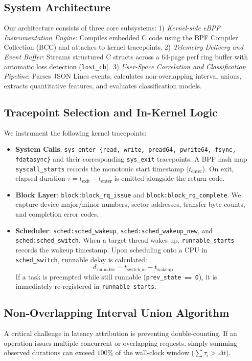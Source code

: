 \documentclass[conference]{IEEEtran}
\begin{document}
\subsection{System Architecture}
Our architecture consists of three core subsystems:
1) \textit{Kernel-side eBPF Instrumentation Engine}: Compiles embedded C code using the BPF Compiler Collection (BCC) and attaches to kernel tracepoints.
2) \textit{Telemetry Delivery and Event Buffer}: Streams structured C structs across a 64-page perf ring buffer with automatic loss detection (\texttt{lost\_cb}).
3) \textit{User-Space Correlation and Classification Pipeline}: Parses JSON Lines events, calculates non-overlapping interval unions, extracts quantitative features, and evaluates classification models.

\subsection{Tracepoint Selection and In-Kernel Logic}
We instrument the following kernel tracepoints:
\begin{itemize}
    \item \textbf{System Calls}: \texttt{sys\_enter\_\{read, write, pread64, pwrite64, fsync, fdatasync\}} and their corresponding \texttt{sys\_exit} tracepoints. A BPF hash map \texttt{syscall\_starts} records the monotonic start timestamp ($t_{\text{enter}}$). On exit, elapsed duration $\tau = t_{\text{exit}} - t_{\text{enter}}$ is emitted alongside the return code.
    \item \textbf{Block Layer}: \texttt{block:block\_rq\_issue} and \texttt{block:block\_rq\_complete}. We capture device major/minor numbers, sector addresses, transfer byte counts, and completion error codes.
    \item \textbf{Scheduler}: \texttt{sched:sched\_wakeup}, \texttt{sched:sched\_wakeup\_new}, and \texttt{sched:sched\_switch}. When a target thread wakes up, \texttt{runnable\_starts} records the wakeup timestamp. Upon scheduling onto a CPU in \texttt{sched\_switch}, runnable delay is calculated:
    \begin{equation}
        d_{\text{runnable}} = t_{\text{switch\_in}} - t_{\text{wakeup}}
    \end{equation}
    If a task is preempted while still runnable (\texttt{prev\_state == 0}), it is immediately re-registered in \texttt{runnable\_starts}.
\end{itemize}

\subsection{Non-Overlapping Interval Union Algorithm}
A critical challenge in latency attribution is preventing double-counting. If an operation issues multiple concurrent or overlapping requests, simply summing observed durations can exceed $100\%$ of the wall-clock window ($\sum \tau_i > \Delta t$). 
\end{document}
